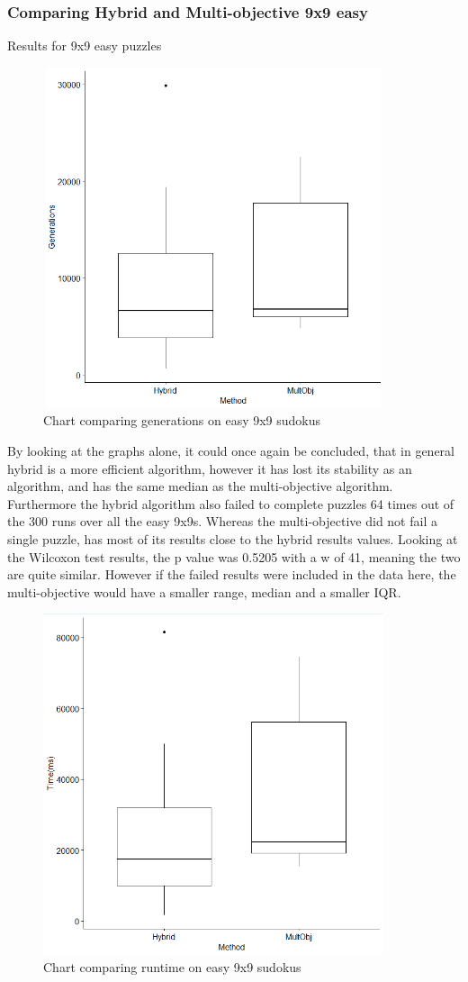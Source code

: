 \documentclass[a4paper,11pt]{article}
\begin{document}
\subsubsection{Comparing Hybrid and Multi-objective 9x9 easy}
Results for 9x9 easy puzzles
\begin{figure}[H]
	\centering
	\includegraphics[height=10cm,width=10cm]{./Diagrams/barChartComparing9x9Easy}
	\caption{Chart comparing generations on easy 9x9 sudokus}
\end{figure}
By looking at the graphs alone, it could once again be concluded, that in general hybrid is a more efficient algorithm, however it has lost its stability as an algorithm, and has the same median as the multi-objective algorithm. Furthermore the hybrid algorithm also failed to complete puzzles 64 times out of the 300 runs over all the easy 9x9s. Whereas the multi-objective did not fail a single puzzle, has most of its results close to the hybrid results values. Looking at the Wilcoxon test results, the p value was 0.5205 with a w of 41, meaning the two are quite similar. However if the failed results were included in the data here, the multi-objective would have a smaller range, median and a smaller IQR.
\begin{figure}[H]
	\centering
	\includegraphics[height=10cm,width=10cm]{./Diagrams/barChart9x9EasyTime}
	\caption{Chart comparing runtime on easy 9x9 sudokus}
\end{figure}
\end{document}
